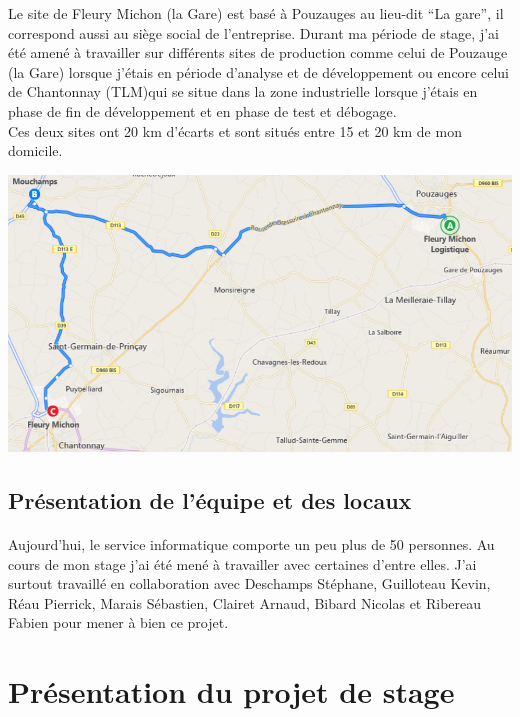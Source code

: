 \documentclass[a4paper,12pt]{extarticle}
\begin{document}
	Le site de Fleury Michon (la Gare) est basé à Pouzauges au lieu-dit “La gare”, il correspond aussi au siège social de l’entreprise. Durant ma période de stage, j’ai été amené à travailler sur différents sites de production comme celui de Pouzauge (la Gare) lorsque j’étais en période d’analyse et de développement ou encore celui de Chantonnay (TLM)qui se situe dans la zone industrielle lorsque j’étais en phase de fin de développement et en phase de test et débogage.\\
Ces deux sites ont 20 km d’écarts et sont situés entre 15 et 20 km de mon domicile.\\

	\centerline{\includegraphics[scale=0.40]{Img/Img_SituationGeo}}

	\subsection{Présentation de l'équipe et des locaux}
		\paragraph{}

	Aujourd’hui, le service informatique comporte un peu plus de 50 personnes. Au cours de mon stage j’ai été mené à travailler avec certaines d’entre elles.
J’ai surtout travaillé en collaboration avec Deschamps Stéphane, Guilloteau Kevin, Réau Pierrick, Marais Sébastien, Clairet Arnaud, Bibard Nicolas et Ribereau Fabien pour mener à bien ce projet.\\

	\clearpage
	
	\section{Présentation du projet de stage}
	
\end{document}
